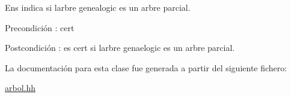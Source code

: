 Ens indica si l\textquotesingle{}arbre genealogic es un arbre parcial. 

\begin{DoxyPrecond}{Precondición}
\+: cert 
\end{DoxyPrecond}
\begin{DoxyPostcond}{Postcondición}
\+: es cert si l\textquotesingle{}arbre genaelogic es un arbre parcial. 
\end{DoxyPostcond}


La documentación para esta clase fue generada a partir del siguiente fichero\+:\begin{DoxyCompactItemize}
\item 
\hyperlink{arbol_8hh}{arbol.\+hh}\end{DoxyCompactItemize}
